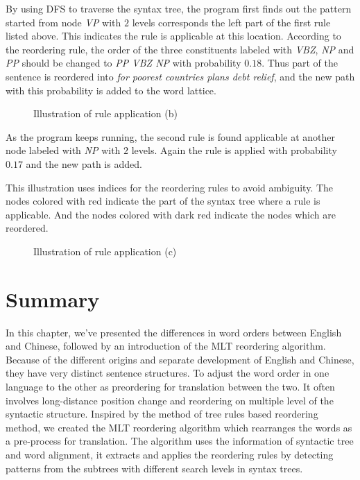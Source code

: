 By using \ac{DFS} to traverse the syntax tree, the program first finds out the pattern started from node \emph{VP} with $2$ levels corresponds the left part of the first rule listed above. This indicates the rule is applicable at this location. According to the reordering rule, the order of the three constituents labeled with \emph{VBZ}, \emph{NP} and \emph{PP} should be changed to \emph{PP VBZ NP} with probability $0.18$. Thus part of the sentence is reordered into \emph{for poorest countries plans debt relief}, and the new path with this probability is added to the word lattice.

\begin{figure}
\centering
\subfigure{

}
\subfigure{

}
\caption{Illustration of rule application (b)}
\end{figure}

As the program keeps running, the second rule is found applicable at another node labeled with \emph{NP} with $2$ levels. Again the rule is applied with probability $0.17$ and the new path is added. 

This illustration uses indices for the reordering rules to avoid ambiguity. The nodes colored with red indicate the part of the syntax tree where a rule is applicable. And the nodes colored with dark red indicate the nodes which are reordered.

\begin{figure}[H]
\centering
\subfigure{

}
\subfigure{

}
\caption{Illustration of rule application (c)}
\end{figure}

\section{Summary}
In this chapter, we've presented the differences in word orders between English and Chinese, followed by an introduction of the \ac{MLT} reordering algorithm. Because of the different origins and separate development of English and Chinese, they have very distinct sentence structures. To adjust the word order in one language to the other as preordering for translation between the two. It often involves long-distance position change and reordering on multiple level of the syntactic structure. Inspired by the method of tree rules based reordering method, we created the \ac{MLT} reordering algorithm which rearranges the words as a pre-process for translation. The algorithm uses the information of syntactic tree and word alignment, it extracts and applies the reordering rules by detecting patterns from the subtrees with different search levels in syntax trees.
